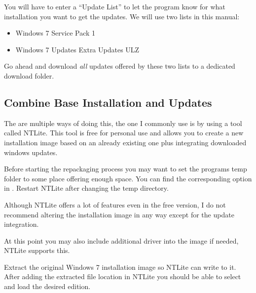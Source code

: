 \documentclass{itsarticle}
\begin{document}

You will have to enter a ``Update List'' to let the program know for what
installation you want to get the updates. We will use two lists in this manual:

\begin{itemize}
    \item Windows 7 Service Pack 1\footnotemark
    \item Windows 7 Updates Extra Updates ULZ\footnotemark
\end{itemize}


Go ahead and download \emph{all} updates offered by these two lists to a
dedicated download folder.

\subsection{Combine Base Installation and Updates}
\label{sub:ntlite}

The are multiple ways of doing this, the one I commonly use is by using a tool
called NTLite\footnotemark. This tool is free for personal use and allows you
to create a new installation image based on an already existing one plus
integrating downloaded windows updates.


Before starting the repackaging process you may want to set the programs temp
folder to some place offering enough space. You can find the corresponding
option in . Restart NTLite
after changing the temp directory.

Although NTLite offers a lot of features even in the free version, I do not
recommend altering the installation image in any way except for the update
integration.

At this point you may also include additional driver into the image if needed,
NTLite supports this.

Extract the original Windows 7 installation image so NTLite can write to it.
After adding the extracted file location in NTLite you should be able to select
and load the desired edition.
\end{document}
